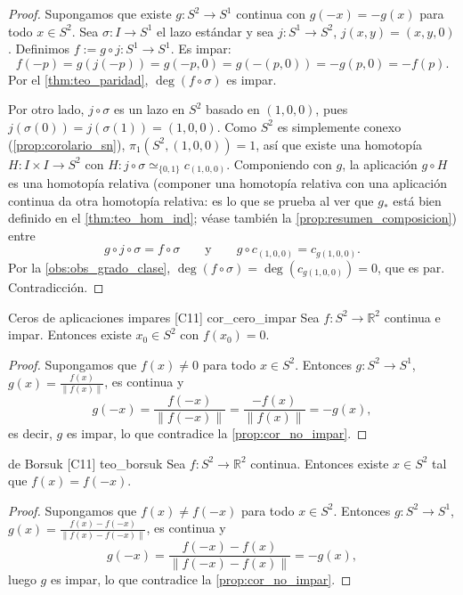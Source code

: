 \begin{proof}
Supongamos que existe $g \colon S^2 \to S^1$ continua con $g(-x) = -g(x)$ para todo $x \in S^2$. Sea $\sigma \colon I \to S^1$ el lazo estándar y sea $j \colon S^1 \to S^2$, $j(x,y) = (x,y,0)$. Definimos $f := g \circ j \colon S^1 \to S^1$. Es impar:
\[ f(-p) = g(j(-p)) = g(-p,0) = g(-(p,0)) = -g(p,0) = -f(p). \]
Por el \cref{thm:teo_paridad}, $\deg(f \circ \sigma)$ es impar.

Por otro lado, $j \circ \sigma$ es un lazo en $S^2$ basado en $(1,0,0)$, pues $j(\sigma(0)) = j(\sigma(1)) = (1,0,0)$. Como $S^2$ es simplemente conexo (\cref{prop:corolario_sn}), $\pi_1(S^2,(1,0,0)) = 1$, así que existe una homotopía $H \colon I \times I \to S^2$ con $H \colon j \circ \sigma \simeq_{\{0,1\}} c_{(1,0,0)}$. Componiendo con $g$, la aplicación $g \circ H$ es una homotopía relativa (componer una homotopía relativa con una aplicación continua da otra homotopía relativa: es lo que se prueba al ver que $g_*$ está bien definido en el \cref{thm:teo_hom_ind}; véase también la \cref{prop:resumen_composicion}) entre
\[ g \circ j \circ \sigma = f \circ \sigma \qquad\text{y}\qquad g \circ c_{(1,0,0)} = c_{g(1,0,0)}. \]
Por la \cref{obs:obs_grado_clase}, $\deg(f \circ \sigma) = \deg(c_{g(1,0,0)}) = 0$, que es par. Contradicción.
\end{proof}

\begin{proposicion}{Ceros de aplicaciones impares [C11] \marcaC}{cor_cero_impar}
Sea $f \colon S^2 \to \mathbb{R}^2$ continua e impar. Entonces existe $x_0 \in S^2$ con $f(x_0) = 0$.
\end{proposicion}

\begin{proof}
Supongamos que $f(x) \neq 0$ para todo $x \in S^2$. Entonces $g \colon S^2 \to S^1$, $g(x) = \frac{f(x)}{\|f(x)\|}$, es continua y
\[ g(-x) = \frac{f(-x)}{\|f(-x)\|} = \frac{-f(x)}{\|f(x)\|} = -g(x), \]
es decir, $g$ es impar, lo que contradice la \cref{prop:cor_no_impar}.
\end{proof}

\begin{teorema}{de Borsuk [C11] \marcaC}{teo_borsuk}
Sea $f \colon S^2 \to \mathbb{R}^2$ continua. Entonces existe $x \in S^2$ tal que $f(x) = f(-x)$.
\end{teorema}

\begin{proof}
Supongamos que $f(x) \neq f(-x)$ para todo $x \in S^2$. Entonces $g \colon S^2 \to S^1$, $g(x) = \frac{f(x) - f(-x)}{\|f(x) - f(-x)\|}$, es continua y
\[ g(-x) = \frac{f(-x) - f(x)}{\|f(-x) - f(x)\|} = -g(x), \]
luego $g$ es impar, lo que contradice la \cref{prop:cor_no_impar}.
\end{proof}

